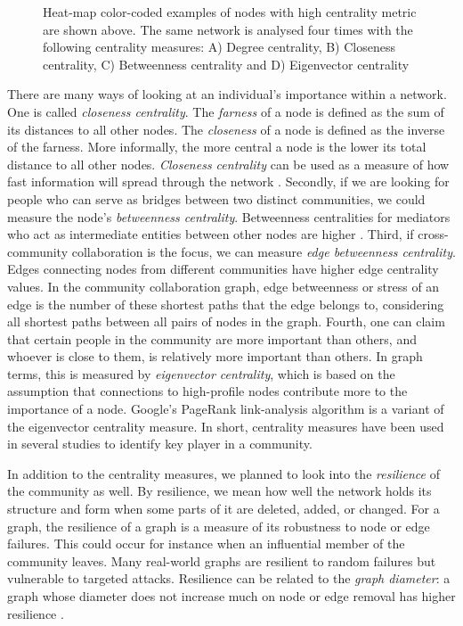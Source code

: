 \documentclass{acm_proc_article-sp}
\begin{document}
\begin{figure}[!ht]
\centering
{}
\caption{Heat-map color-coded examples of nodes with high centrality metric are shown above. The same network is analysed four times with the following centrality measures:  A) Degree centrality, B) Closeness centrality, C) Betweenness centrality and D) Eigenvector centrality \cite{Rocchini}}
\label{figureCentrality}
\end{figure}

There are many ways of looking at an individual's importance within a network. One is called \textit{closeness centrality}. The \textit{farness} of a node is defined as the sum of its distances to all other nodes. The \textit{closeness} of a node is defined as the inverse of the farness. More informally, the more central a node is the lower its total distance to all other nodes. \textit{Closeness centrality} can be used as a measure of how fast information will spread through the network \cite{Chakrabarti}. Secondly, if we are looking for people who can serve as bridges between two distinct communities, we could measure the node's \textit{betweenness centrality}. Betweenness centralities for mediators who act as intermediate entities between other nodes are higher \cite{Chakrabarti}.  Third, if cross-community collaboration is the focus, we can measure \textit{edge betweenness centrality}.  Edges connecting nodes from different communities have higher edge centrality values. In the community collaboration graph, edge betweenness or stress of an edge is the number of these shortest paths that the edge belongs to, considering all shortest paths between all pairs of nodes in the graph. Fourth, one can claim that certain people in the community are more important than others, and whoever is close to them, is relatively more important than others. In graph terms, this is measured by \textit{eigenvector centrality}, which is based on the assumption that connections to high-profile nodes contribute more to the importance of a node. Google's PageRank link-analysis algorithm \cite{Page} is a variant of the eigenvector centrality measure. In short, centrality measures have been used in several studies to identify key player in a community.

In addition to the centrality measures, we planned to look into the \textit{resilience} of the community as well. By resilience, we mean how well the network holds its structure and form when some parts of it are deleted, added, or changed. For a graph, the resilience of a graph is a measure of its robustness to node or edge failures. This could occur for instance when an influential member of the community leaves. Many real-world graphs are resilient to random failures but vulnerable to targeted attacks. Resilience can be related to the \textit{graph diameter}: a graph whose diameter does not increase much on node or edge removal has higher resilience \cite{Chakrabarti}.
\end{document}
